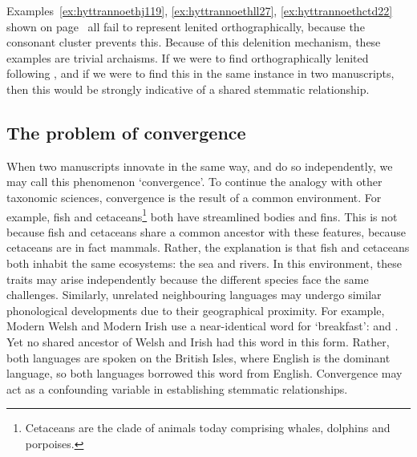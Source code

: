 Examples~\ref{ex:hyttrannoethj119}, \ref{ex:hyttrannoethll27}, \ref{ex:hyttrannoethctd22} shown on page~ all fail to represent lenited  orthographically, because the  consonant cluster prevents this. Because of this delenition mechanism, these examples are trivial archaisms. If we were to find orthographically lenited  following , and if we were to find this in the same instance in two manuscripts, then this would be strongly indicative of a shared stemmatic relationship.



\subsection{The problem of convergence}
\label{sec:problem-convergence}


When two manuscripts innovate in the same way, and do so independently, we may call this phenomenon `convergence'. To continue the analogy with other taxonomic sciences, convergence is the result of a common environment. For example, fish and cetaceans\footnote{Cetaceans are the clade of animals today comprising whales, dolphins and porpoises.} both have streamlined bodies and fins. This is not because fish and cetaceans share a common ancestor with these features, because cetaceans are in fact mammals. Rather, the explanation is that fish and cetaceans both inhabit the same ecosystems: the sea and rivers. In this environment, these traits may arise independently because the different species face the same challenges. Similarly, unrelated neighbouring languages may undergo similar phonological developments due to their geographical proximity. For example, Modern Welsh and Modern Irish use a near-identical word for `breakfast':  and . Yet no shared ancestor of Welsh and Irish had this word in this form. Rather, both languages are spoken on the British Isles, where English is the dominant language, so both languages borrowed this word from English. Convergence may act as a confounding variable in establishing stemmatic relationships.

